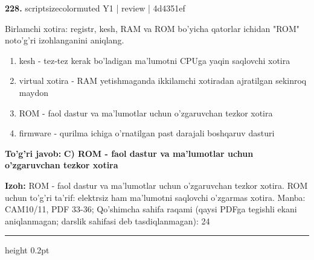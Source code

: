 \documentclass[10pt,a4paper]{article}
\begin{document}
{\bfseries\sffamily\color{ink} 228.} {scriptsizecolor{muted} Y1 | review | 4d4351ef}
\par
Birlamchi xotira: registr, kesh, RAM va ROM bo'yicha qatorlar ichidan "ROM" noto'g'ri izohlanganini aniqlang.
\begin{enumerate}[label=\Alph*),leftmargin=9mm]
\item kesh - tez-tez kerak bo'ladigan ma'lumotni CPUga yaqin saqlovchi xotira
\item virtual xotira - RAM yetishmaganda ikkilamchi xotiradan ajratilgan sekinroq maydon
\item ROM - faol dastur va ma'lumotlar uchun o'zgaruvchan tezkor xotira
\item firmware - qurilma ichiga o'rnatilgan past darajali boshqaruv dasturi
\end{enumerate}
\begin{tcolorbox}[enhanced,breakable,colback=teal!4,colframe=teal!60!black,boxrule=0.45pt,arc=1.2mm,left=2.7mm,right=2.7mm,top=1.8mm,bottom=1.8mm,before skip=2mm,after skip=2mm]
{\bfseries\sffamily\color{teal}To'g'ri javob:} \textbf{C) ROM - faol dastur va ma'lumotlar uchun o'zgaruvchan tezkor xotira}
\par\smallskip
{\bfseries Izoh:} ROM - faol dastur va ma'lumotlar uchun o'zgaruvchan tezkor xotira. ROM uchun to'g'ri ta'rif: elektrsiz ham ma'lumotni saqlovchi o'zgarmas xotira. Manba: CAM10/11, PDF 33-36; Qo'shimcha sahifa raqami (qaysi PDFga tegishli ekani aniqlanmagan; darslik sahifasi deb tasdiqlanmagan): 24
\end{tcolorbox}
\vspace{2mm}\hrule height 0.2pt\vspace{3mm}
\end{document}
